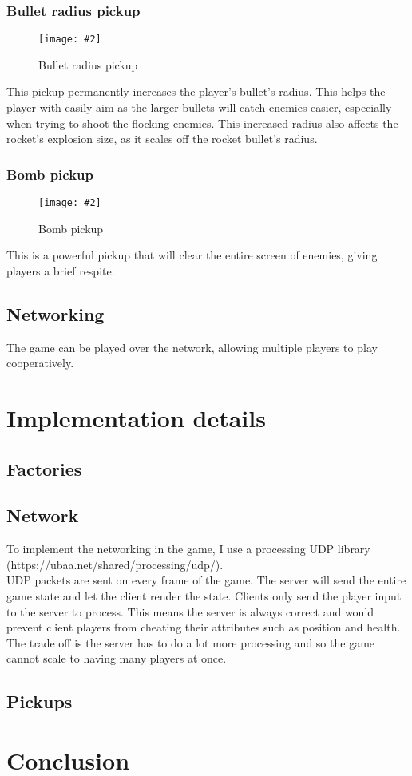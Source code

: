 \documentclass{article}
\newcommand{\n}[0]{\\[\baselineskip]}
\newcommand{\figimg}[3]{
  \begin{figure}[H]
    \centering
    \texttt{[image: \#2]}
    \caption{#3}
  \end{figure}
  \noindent 
}
\begin{document}
\subsubsection{Bullet radius pickup}
\figimg{0.1}{imgs/RadiusPickup.png}{Bullet radius pickup}
This pickup permanently increases the player's bullet's radius. This helps the player with easily aim as the larger bullets will catch enemies easier, especially when trying to shoot the flocking enemies. This increased radius also affects the rocket's explosion size, as it scales off the rocket bullet's radius.

\subsubsection{Bomb pickup}
\figimg{0.1}{imgs/BombPickup.png}{Bomb pickup}
This is a powerful pickup that will clear the entire screen of enemies, giving players a brief respite. 

\subsection{Networking}
The game can be played over the network, allowing multiple players to play cooperatively.

\section{Implementation details}


\subsection{Factories}

\subsection{Network}
To implement the networking in the game, I use a processing UDP library (https://ubaa.net/shared/processing/udp/).
\n
UDP packets are sent on every frame of the game. The server will send the entire game state and let the client render the state. Clients only send the player input to the server to process. This means the server is always correct and would prevent client players from cheating their attributes such as position and health. The trade off is the server has to do a lot more processing and so the game cannot scale to having many players at once.


\subsection{Pickups}

\section{Conclusion}


\printbibliography
\end{document}
